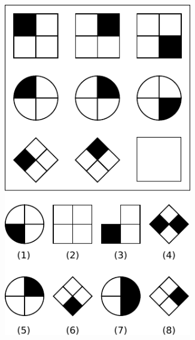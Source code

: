 \documentclass[10pt,letterpaper,oneside]{article}
\begin{document}
\begin{figure}[t]
	\centering%
	\begin{subfigure}{0.33\textwidth}%
		\centering%
		\includegraphics[width=0.9\textwidth]{media/ravens_example_a.pdf}%
		\caption{}%
		\label{fig:ravens_example_a}%
	\end{subfigure}%
	\begin{subfigure}{0.33\textwidth}%
		\centering%

\end{subfigure}
\end{figure}
\end{document}
